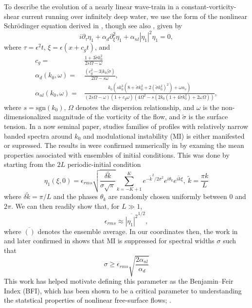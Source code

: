 \documentclass[a4paper,11pt]{article}
\newcommand{\pd}{\partial}
\begin{document}
To describe the evolution of a nearly linear wave-train in a constant-vorticity-shear current running over infinitely deep water, we use the form of the nonlinear Schr\"{o}dinger equation derived in \cite{curtis8}, though see also \cite{thomas2012nonlinear}, given by 
\[
i\pd_{\tau}\eta_{1} + \alpha_{d}\pd_{\xi}^{2}\eta_{1} + \alpha_{nl}\left|\eta_{1} \right|^{2}\eta_{1} = 0, 
\]
where $\tau = \epsilon^{2}t$, $\xi = \epsilon(x+c_{g}t)$, and 
\begin{align*}
c_{g} = & \frac{1+3\tilde{\sigma}k_{0}^{2}}{2s\Omega - \omega}\\
\alpha_{d}(k_{0},\omega) = & \frac{(c^2_{g} - 3|k_{0}|\tilde{\sigma})}{2\Omega-s\omega},\\
\alpha_{nl}(k_{0},\omega) = & \frac{k_{0}\left( sk_{0}^{3}\left(8 + \tilde{\sigma}k_{0}^{2} + 2(\tilde{\sigma}k_{0}^{2})^{2}\right) + \omega \alpha_{v}\right)}{\left(2s\Omega -\omega\right)(1+c_{g}\omega)\left(4\Omega^2-s(2k_{0}(1+4\tilde{\sigma}k_{0}^{2})+2\omega\Omega)\right)},
\end{align*}
where $s = \mbox{sgn}(k_{0})$, $\Omega$ denotes the dispersion relationship, and $\omega$ is the non-dimensionalized magnitude of the vorticity of the flow, and $\tilde{\sigma}$ is the surface tension.  In a now seminal paper, \cite{alber} studies families of profiles with relatively narrow banded spectra around $k_{0}$ and modulational instability (MI) is either manifested or supressed.  The results in \cite{alber} were confirmed numerically in \cite{dysthe2,dysthe3} by examing the mean properties associated with ensembles of initial conditions.  This was done by starting from the $2L$ periodic-initial condition
\[
\eta_{1}(\xi,0) = \epsilon_{rms}\sqrt{\frac{\delta \tilde{k}}{\sigma\sqrt{\pi}}} \sum_{k=-K+1}^{K}e^{-\tilde{k}^{2}/2\sigma^{2}}e^{i\theta_{k}}e^{i\tilde{k}\xi}, ~ \tilde{k} = \frac{\pi k}{L}
\]
where $\delta \tilde{k}=\pi/L$ and the phases $\theta_{k}$ are randomly chosen uniformly between $0$ and $2\pi$.  We can then readily show that, for $L\gg 1$, 
\[
\epsilon_{rms} \approx \overline{\left|\eta_{1}\right|^{2}}^{1/2},
\]
where $\overline{()}$ denotes the ensemble average.  In our coordinates then, the work in \cite{alber} and later confirmed in \cite{dysthe2} shows that MI is suppressed for spectral widths $\sigma$ such that 
\[
\sigma \geq \epsilon_{rms}\sqrt{\frac{2\alpha_{nl}}{\alpha_{d}}}
\]
This work has helped motivate defining this parameter as the Benjamin--Feir Index (BFI), which has been shown to be a critical parameter to understanding the statstical properties of nonlinear free-surface flows; \cite{onorato, thomas2012nonlinear}.
\end{document}
